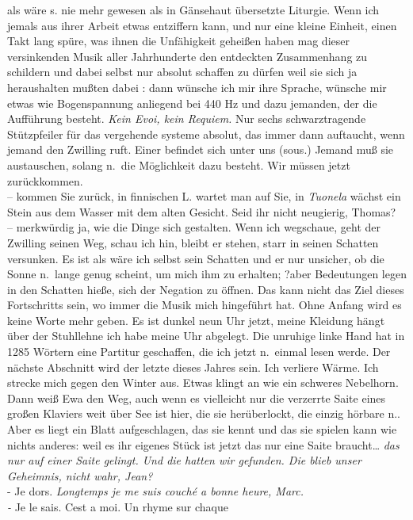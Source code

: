 \documentclass[
]{article}
\begin{document}
als wäre s. nie mehr gewesen als in Gänsehaut übersetzte Liturgie. Wenn
ich jemals aus ihrer Arbeit etwas entziffern kann, und nur eine kleine
Einheit, einen Takt lang spüre, was ihnen die Unfähigkeit geheißen haben
mag dieser versinkenden Musik aller Jahrhunderte den entdeckten
Zusammenhang zu schildern und dabei selbst nur absolut schaffen zu
dürfen weil sie sich ja heraushalten mußten dabei : dann wünsche ich mir
ihre Sprache, wünsche mir etwas wie Bogenspannung anliegend bei 440 Hz
und dazu jemanden, der die Aufführung besteht. \emph{Kein Evoi, kein
Requiem.} Nur sechs schwarztragende Stützpfeiler für das vergehende
systeme absolut, das immer dann auftaucht, wenn jemand den Zwilling
ruft. Einer befindet sich unter uns (sous.) Jemand muß sie austauschen,
solang n.~die Möglichkeit dazu besteht. Wir müssen jetzt zurückkommen.\\
-- kommen Sie zurück, in finnischen L. wartet man auf Sie, in
\emph{Tuonela} wächst ein Stein aus dem Wasser mit dem alten Gesicht.
Seid ihr nicht neugierig, Thomas?\\
-- merkwürdig ja, wie die Dinge sich gestalten. Wenn ich wegschaue, geht
der Zwilling seinen Weg, schau ich hin, bleibt er stehen, starr in
seinen Schatten versunken. Es ist als wäre ich selbst sein Schatten und
er nur unsicher, ob die Sonne n.~lange genug scheint, um mich ihm zu
erhalten; ?aber Bedeutungen legen in den Schatten hieße, sich der
Negation zu öffnen. Das kann nicht das Ziel dieses Fortschritts sein, wo
immer die Musik mich hingeführt hat. Ohne Anfang wird es keine Worte
mehr geben. Es ist dunkel neun Uhr jetzt, meine Kleidung hängt über der
Stuhllehne ich habe meine Uhr abgelegt. Die unruhige linke Hand hat in
1285 Wörtern eine Partitur geschaffen, die ich jetzt n.~einmal lesen
werde. Der nächste Abschnitt wird der letzte dieses Jahres sein. Ich
verliere Wärme. Ich strecke mich gegen den Winter aus. Etwas klingt an
wie ein schweres Nebelhorn. Dann weiß Ewa den Weg, auch wenn es
vielleicht nur die verzerrte Saite eines großen Klaviers weit über See
ist hier, die sie herüberlockt, die einzig hörbare n.. Aber es liegt ein
Blatt aufgeschlagen, das sie kennt und das sie spielen kann wie nichts
anderes: weil es ihr eigenes Stück ist jetzt das nur eine Saite
braucht\ldots{} \emph{das nur auf einer Saite gelingt. Und die hatten
wir gefunden. Die blieb unser Geheimnis, nicht wahr, Jean? }\\
- Je dors. \emph{Longtemps je me suis couché a bonne heure, Marc.}\\
\emph{- }Je le sais. C\textquotesingle est a moi. Un rhyme sur chaque
\end{document}
